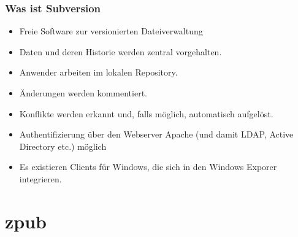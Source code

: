\documentclass{beamer}
\begin{document}
\begin{frame}
\frametitle{Was ist Subversion}
\begin{itemize}
\item Freie Software zur versionierten Dateiverwaltung
\item Daten und deren Historie werden zentral vorgehalten.
\item Anwender arbeiten im lokalen Repository.
\item Änderungen werden kommentiert.
\item Konflikte werden erkannt und, falls möglich, automatisch aufgelöst.
\item Authentifizierung über den Webserver Apache (und damit LDAP, Active Directory etc.) möglich
\item Es existieren Clients für Windows, die sich in den Windows Exporer integrieren.
\end{itemize}
\end{frame}



\section{zpub}
\end{document}
